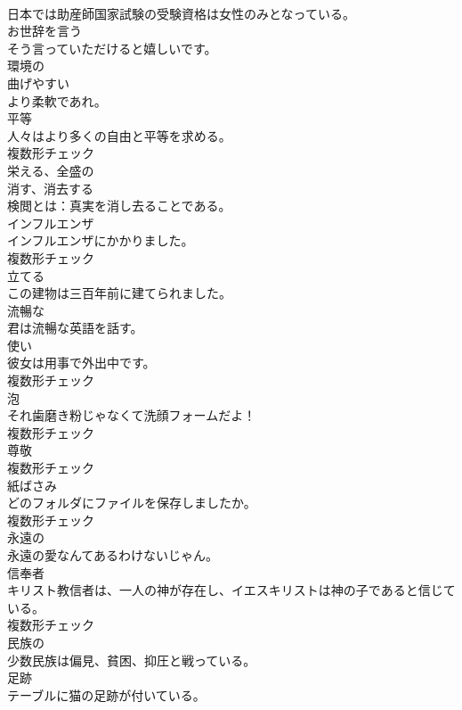 \documentclass[8pt]{extreport}
\begin{document}
\begin{CJK}{UTF8}{min}
\\	日本では助産師国家試験の受験資格は女性のみとなっている。	
\\	[動詞]	お世辞を言う	
\\	そう言っていただけると嬉しいです。	
\\	[形容詞]	環境の	
\\	[形容詞]	曲げやすい	
\\	より柔軟であれ。	
\\	[名詞]	平等	
\\	人々はより多くの自由と平等を求める。	
\\	複数形チェック
\\	[形容詞]	栄える、全盛の	
\\	[動詞]	消す、消去する	
\\	検閲とは：真実を消し去ることである。	
\\	[名詞]	インフルエンザ	
\\	インフルエンザにかかりました。	
\\	複数形チェック
\\	[動詞]	立てる	
\\	この建物は三百年前に建てられました。	
\\	[形容詞]	流暢な	
\\	君は流暢な英語を話す。	
\\	[名詞]	使い	
\\	彼女は用事で外出中です。	
\\	複数形チェック
\\	[名詞]	泡	
\\	それ歯磨き粉じゃなくて洗顔フォームだよ！	
\\	複数形チェック
\\	[名詞]	尊敬	
\\	複数形チェック
\\	[名詞]	紙ばさみ	
\\	どのフォルダにファイルを保存しましたか。	
\\	複数形チェック
\\	[形容詞]	永遠の	
\\	永遠の愛なんてあるわけないじゃん。	
\\	[名詞]	信奉者	
\\	キリスト教信者は、一人の神が存在し、イエスキリストは神の子であると信じている。	
\\	複数形チェック
\\	[形容詞]	⺠族の	
\\	少数民族は偏見、貧困、抑圧と戦っている。	
\\	[名詞]	足跡	
\\	テーブルに猫の足跡が付いている。	

\end{CJK}
\end{document}
